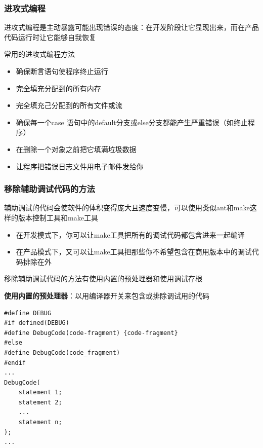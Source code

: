\subsubsection{进攻式编程}
进攻式编程是主动暴露可能出现错误的态度：在开发阶段让它显现出来，而在产品代码运行时让它能够自我恢复

常用的进攻式编程方法
\begin{itemize}
    \item 确保断言语句使程序终止运行
    \item 完全填充分配到的所有内存
    \item 完全填充己分配到的所有文件或流
    \item 确保每一个case 语句中的default分支或else分支都能产生严重错误（如终止程序）
    \item 在删除一个对象之前把它填满垃圾数据
    \item 让程序把错误日志文件用电子邮件发给你
\end{itemize}

\subsubsection{移除辅助调试代码的方法}
辅助调试的代码会使软件的体积变得庞大且速度变慢，可以使用类似ant和make这样的版本控制工具和make工具
\begin{itemize}
    \item 在开发模式下，你可以让make工具把所有的调试代码都包含进来一起编译
    \item 在产品模式下，又可以让make工具把那些你不希望包含在商用版本中的调试代码排除在外
\end{itemize}

移除辅助调试代码的方法有使用内置的预处理器和使用调试存根

\textbf{使用内置的预处理器}：以用编译器开关来包含或排除调试用的代码
\begin{lstlisting}
#define DEBUG
#if defined(DEBUG)
#define DebugCode(code-fragment) {code-fragment}
#else
#define DebugCode(code_fragment)
#endif
...
DebugCode(
    statement 1;
    statement 2;
    ...
    statement n;
);
...
\end{lstlisting}


